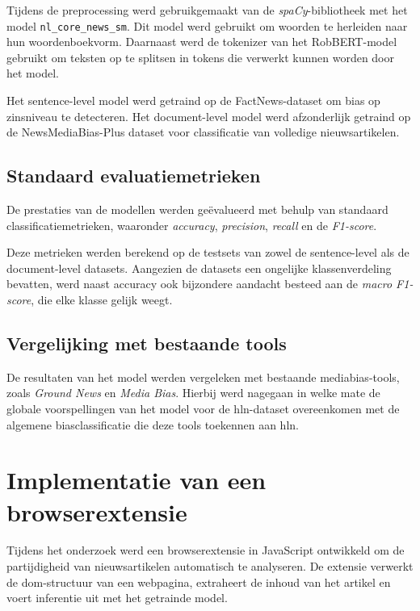 Tijdens de preprocessing werd gebruikgemaakt van de \textit{spaCy}-bibliotheek met het model \texttt{nl\_core\_news\_sm}. Dit model werd gebruikt om woorden te herleiden naar hun woordenboekvorm. Daarnaast werd de tokenizer van het RobBERT-model gebruikt om teksten op te splitsen in tokens die verwerkt kunnen worden door het model.

Het sentence-level model werd getraind op de FactNews-dataset om bias op zinsniveau te detecteren. Het document-level model werd afzonderlijk getraind op de NewsMediaBias-Plus dataset voor classificatie van volledige nieuwsartikelen.

\subsection{Standaard evaluatiemetrieken}

De prestaties van de modellen werden geëvalueerd met behulp van standaard classificatiemetrieken, waaronder \textit{accuracy}, \textit{precision}, \textit{recall} en de \textit{F1-score}. 

Deze metrieken werden berekend op de testsets van zowel de sentence-level als de document-level datasets. Aangezien de datasets een ongelijke klassenverdeling bevatten, werd naast accuracy ook bijzondere aandacht besteed aan de \textit{macro F1-score}, die elke klasse gelijk weegt.

\subsection{Vergelijking met bestaande tools}

De resultaten van het model werden vergeleken met bestaande mediabias-tools, zoals \textit{Ground News} en \textit{Media Bias}. Hierbij werd nagegaan in welke mate de globale voorspellingen van het model voor de \gls{hln}-dataset overeenkomen met de algemene biasclassificatie die deze tools toekennen aan \gls{hln}.

\section{Implementatie van een browserextensie}
\label{sec:implementatie-van-een-browserextensie}

Tijdens het onderzoek werd een browserextensie in JavaScript ontwikkeld om de partijdigheid van nieuwsartikelen automatisch te analyseren. De extensie verwerkt de \gls{dom}-structuur van een webpagina, extraheert de inhoud van het artikel en voert inferentie uit met het getrainde model.

